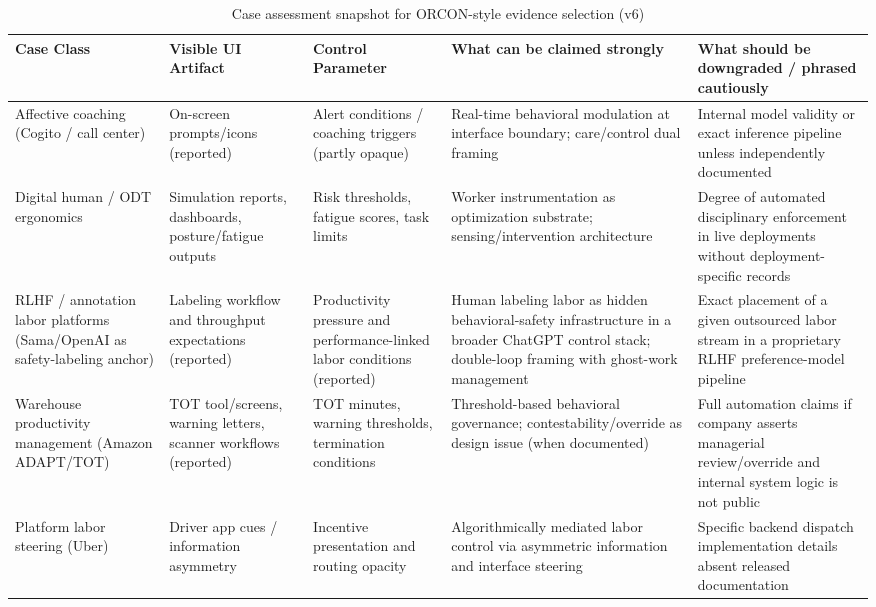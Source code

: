 \documentclass[runningheads]{llncs}
\begin{document}
\begin{table}
\caption{Case assessment snapshot for ORCON-style evidence selection (v6)}\label{tab:case-assessment}
\centering
\small
\begin{tabular}{|p{2.4cm}|p{2.8cm}|p{2.3cm}|p{3.1cm}|p{3.1cm}|}
\hline
\textbf{Case Class} & \textbf{Visible UI Artifact} & \textbf{Control Parameter} & \textbf{What can be claimed strongly} & \textbf{What should be downgraded / phrased cautiously} \\
\hline
Affective coaching (Cogito / call center) & On-screen prompts/icons (reported) & Alert conditions / coaching triggers (partly opaque) & Real-time behavioral modulation at interface boundary; care/control dual framing \cite{delagarza2019time,cogito2023businesswire} & Internal model validity or exact inference pipeline unless independently documented \\
\hline
Digital human / ODT ergonomics & Simulation reports, dashboards, posture/fatigue outputs & Risk thresholds, fatigue scores, task limits & Worker instrumentation as optimization substrate; sensing/intervention architecture \cite{siemensPSXHuman,siemensHumanAdvanced} & Degree of automated disciplinary enforcement in live deployments without deployment-specific records \\
\hline
RLHF / annotation labor platforms (Sama/OpenAI as safety-labeling anchor) & Labeling workflow and throughput expectations (reported) & Productivity pressure and performance-linked labor conditions (reported) & Human labeling labor as hidden behavioral-safety infrastructure in a broader ChatGPT control stack; double-loop framing with ghost-work management \cite{perrigo2023time,gray2019ghost,kellogg2020algorithms} & Exact placement of a given outsourced labor stream in a proprietary RLHF preference-model pipeline \\
\hline
Warehouse productivity management (Amazon ADAPT/TOT) & TOT tool/screens, warning letters, scanner workflows (reported) & TOT minutes, warning thresholds, termination conditions & Threshold-based behavioral governance; contestability/override as design issue (when documented) \cite{gurley2022vice} & Full automation claims if company asserts managerial review/override and internal system logic is not public \\
\hline
Platform labor steering (Uber) & Driver app cues / information asymmetry & Incentive presentation and routing opacity & Algorithmically mediated labor control via asymmetric information and interface steering \cite{rosenblat2016uber} & Specific backend dispatch implementation details absent released documentation \\
\hline
\end{tabular}
\end{table}
\end{document}
